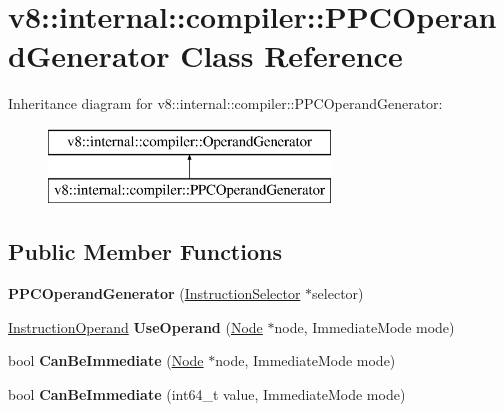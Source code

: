 \hypertarget{classv8_1_1internal_1_1compiler_1_1_p_p_c_operand_generator}{}\section{v8\+:\+:internal\+:\+:compiler\+:\+:P\+P\+C\+Operand\+Generator Class Reference}
\label{classv8_1_1internal_1_1compiler_1_1_p_p_c_operand_generator}
Inheritance diagram for v8\+:\+:internal\+:\+:compiler\+:\+:P\+P\+C\+Operand\+Generator\+:\begin{figure}[H]
\begin{center}
\leavevmode
\includegraphics[height=2.000000cm]{classv8_1_1internal_1_1compiler_1_1_p_p_c_operand_generator}
\end{center}
\end{figure}
\subsection*{Public Member Functions}
\begin{DoxyCompactItemize}
\item 
{\bfseries P\+P\+C\+Operand\+Generator} (\hyperlink{classv8_1_1internal_1_1compiler_1_1_instruction_selector}{Instruction\+Selector} $\ast$selector)\hypertarget{classv8_1_1internal_1_1compiler_1_1_p_p_c_operand_generator_ae516eb01286be498524619c0277625db}{}\label{classv8_1_1internal_1_1compiler_1_1_p_p_c_operand_generator_ae516eb01286be498524619c0277625db}

\item 
\hyperlink{classv8_1_1internal_1_1compiler_1_1_instruction_operand}{Instruction\+Operand} {\bfseries Use\+Operand} (\hyperlink{classv8_1_1internal_1_1compiler_1_1_node}{Node} $\ast$node, Immediate\+Mode mode)\hypertarget{classv8_1_1internal_1_1compiler_1_1_p_p_c_operand_generator_ad054082c1a60bb8681ac064de8b61ee9}{}\label{classv8_1_1internal_1_1compiler_1_1_p_p_c_operand_generator_ad054082c1a60bb8681ac064de8b61ee9}

\item 
bool {\bfseries Can\+Be\+Immediate} (\hyperlink{classv8_1_1internal_1_1compiler_1_1_node}{Node} $\ast$node, Immediate\+Mode mode)\hypertarget{classv8_1_1internal_1_1compiler_1_1_p_p_c_operand_generator_afaf091be1bf633a2d92c5851a951cc52}{}\label{classv8_1_1internal_1_1compiler_1_1_p_p_c_operand_generator_afaf091be1bf633a2d92c5851a951cc52}

\item 
bool {\bfseries Can\+Be\+Immediate} (int64\+\_\+t value, Immediate\+Mode mode)\hypertarget{classv8_1_1internal_1_1compiler_1_1_p_p_c_operand_generator_a37245e831b805b215c3acae3fc3a8511}{}\label{classv8_1_1internal_1_1compiler_1_1_p_p_c_operand_generator_a37245e831b805b215c3acae3fc3a8511}

\end{DoxyCompactItemize}
